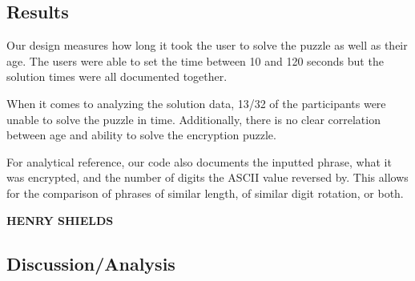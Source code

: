 \documentclass[conference]{IEEEtran}
\begin{document}
\subsection{Results}


\par Our design measures how long it took the user to solve the puzzle as well as their age. The users were able to set the time between 10 and 120 seconds but the solution times were all documented together. 
\par When it comes to analyzing the solution data, 13/32 of the participants were unable to solve the puzzle in time. Additionally, there is no clear correlation between age and ability to solve the encryption puzzle. 
\par For analytical reference, our code also documents the inputted phrase, what it was encrypted, and the number of digits the ASCII value reversed by. This allows for the comparison of phrases of similar length, of similar digit rotation, or both. 

\newpage


\vspace{10pt} \LARGE \textbf{HENRY SHIELDS} \normalsize

\subsection{Discussion/Analysis}
\end{document}
